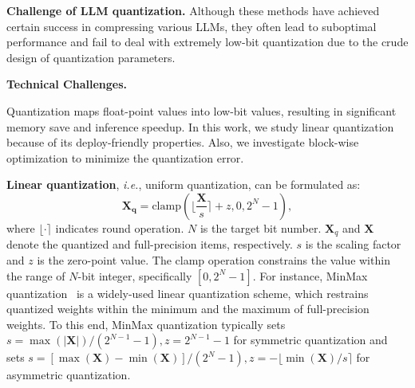 \documentclass{article} %
\begin{document}
\textbf{Challenge of LLM quantization.} Although these methods have achieved certain success in compressing various LLMs, they often lead to suboptimal performance and fail to deal with extremely low-bit quantization due to the crude design of quantization parameters.
%







\textbf{Technical Challenges.}


Quantization maps float-point values into low-bit values, resulting in significant memory save and inference speedup.
%
In this work, we study linear quantization because of its deploy-friendly properties. Also, we investigate block-wise optimization to minimize the quantization error.

\textbf{Linear quantization}, \emph{i.e.}, uniform quantization, can be formulated as:
\begin{equation}\label{eq:quantization}
    \mathbf{X_q} = \mathrm{clamp}(\lfloor \frac{\mathbf{X}}{s} \rceil + z, 0, 2^{N}-1),
\end{equation}
where $\lfloor \cdot \rceil$ indicates round operation. $N$ is the target bit number. $\mathbf{X}_q$ and $\mathbf{X}$ denote the quantized and full-precision items, respectively. $s$ is the scaling factor and $z$ is the zero-point value. The clamp operation constrains the value within the range of $N$-bit integer, specifically $[0, 2^{N}-1]$.
%
For instance, MinMax quantization~\citep{smoothquant} is a widely-used linear quantization scheme, which restrains quantized weights within the minimum and the maximum of full-precision weights. To this end, MinMax quantization typically sets $s={\max(\lvert \mathbf{X} \rvert)}/{(2^{N-1}-1)}, z=2^{N-1}-1$ for symmetric quantization and sets $s=[\max(\mathbf{X})-\min(\mathbf{X} )]/{(2^{N}-1)}, z=-\lfloor {\min(\mathbf{X})}/{s} \rceil$ for asymmetric quantization.
\end{document}
